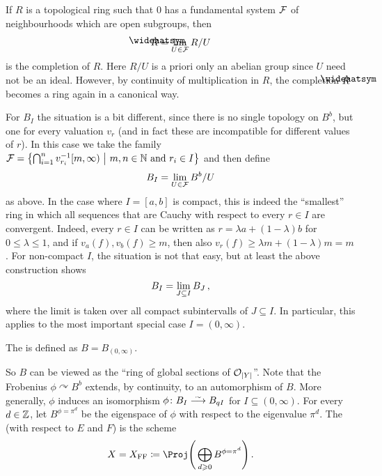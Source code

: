 \documentclass[a4paper, 10pt, oneside, DIV=9, chapterprefix=true, numbers=enddot,bibliography=totoc]{scrbook}
\DeclareRobustCommand{\Attention}{\tikz[baseline, anchor=base]\node[draw, regular polygon, regular polygon sides=3, rounded corners=2, thick, inner sep=-0.25pt] at (0,0) {\textbf{!}};}
\begin{document}
\begin{rem}
	If $R$ is a topological ring such that $0$ has a fundamental system $\mathcal{F}$ of neighbourhoods which are open subgroups, then
	\begin{equation*}
		\roof{R}=\limit_{U\in\Ff}R/U
	\end{equation*}
	is the completion of $R$. Here $R/U$ is a priori only an abelian group since $U$ need not be an ideal. However, by continuity of multiplication in $R$, the completion $\roof{R}$ becomes a ring again in a canonical way.
	
	For $B_I$ the situation is a bit different, since there is no single topology on $B^b$, but one for every valuation $v_r$ (and in fact these are incompatible for different values of $r$).  In this case we take the family $\mathcal{F}=\left\{\bigcap_{i=1}^nv_{r_i}^{-1}[m,\infty)\ \middle|\  m,n\in\mathbb{N}\text{ and }r_i\in I\right\}$ and then define
	\begin{equation*}
		B_I=\operatorname*{lim}_{U\in \mathcal{F}}B^b/U
	\end{equation*}
	as above. In the case where $I=[a,b]$ is compact, this is indeed the \enquote{smallest} ring in which all sequences that are Cauchy with respect to every $r\in I$ are convergent. Indeed, every $r\in I$ can be written as $r=\lambda a+(1-\lambda)b$ for $0\leq \lambda\leq 1$, and if $v_a(f),v_b(f)\geq m$, then also $v_r(f)\geq \lambda m+(1-\lambda)m=m$. For non-compact $I$, the situation is not that easy, but at least the above construction shows
	\begin{equation*}
		B_I=\operatorname*{lim}_{J\subseteq I}B_J\,,
	\end{equation*}
	where the limit is taken over all compact subintervalls of $J\subseteq I$. In particular, this applies to the most important special case $I=(0,\infty)$.
\end{rem}
\begin{defi}
	The  is defined as $B=B_{(0,\infty)}$.
\end{defi}
So $B$ can be viewed as the \enquote{ring of global sections of $\mathcal{O}_{|Y|}$}. Note that the Frobenius $\phi\curvearrowright B^b$ extends, by continuity, to an automorphism of $B$. More generally, $\phi$ induces an isomorphism $\phi\colon B_I\isomorphism B_{qI}$ for $I\subseteq (0,\infty)$. For every $d\in\mathbb{Z}$, let $B^{\phi=\pi^d}$ be the eigenspace of $\phi$ with respect to the eigenvalue $\pi^d$.
\numpar{Definition~\smash{\Attention}}\label{def:FFC}
The  (with respect to $E$ and $F$) is the scheme
\begin{equation*}
	X=X_\FFC\coloneqq \Proj\Bigg(\bigoplus_{d\geq 0}B^{\phi=\pi^d}\Bigg)\,.
\end{equation*}
\end{document}
